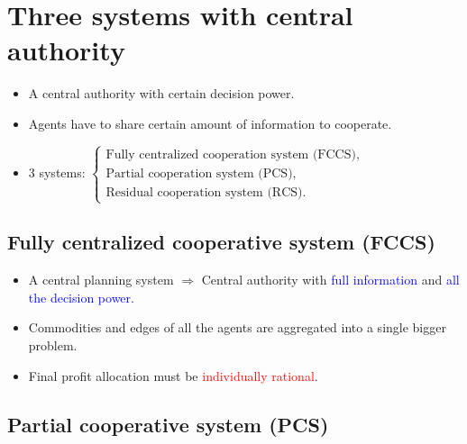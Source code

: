 \documentclass[aspectratio=169]{beamer}
\begin{document}
\section{Three systems with central authority}
\begin{frame}{\secname}
\begin{itemize}
\setlength\itemsep{1em}

\item A central authority with certain decision power.
\item Agents have to share certain amount of information to cooperate.
\item 3 systems: $\begin{cases}
\text{Fully centralized cooperation system (FCCS),}\\
\text{Partial cooperation system (PCS),} \\
\text{Residual cooperation system (RCS).}
\end{cases}$
\end{itemize}
\end{frame}

\subsection{Fully centralized cooperative system (FCCS)} 
\begin{frame}{\subsecname}
\begin{itemize}
\setlength\itemsep{1em}
\item A central planning system $\Longrightarrow$ Central authority with \textcolor{blue}{full information} and \textcolor{blue}{all the decision power.}
\item Commodities and edges of all the agents are aggregated into a single bigger problem.
\item Final profit allocation must be \textcolor{red}{individually rational}.
\end{itemize}
\end{frame}

\subsection{Partial cooperative system (PCS)}

\end{document}
